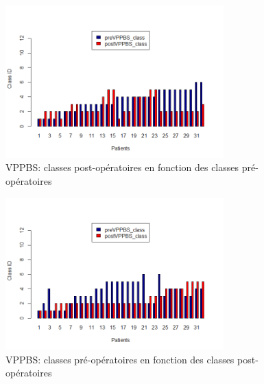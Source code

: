 \begin{figure}[H]
\centering
\includegraphics[width=0.75\textwidth]{../Fig/VPPBS/vppbs-histogram-pre-post.png}
\caption{VPPBS: classes post-opératoires en fonction des classes pré-opératoires}
\label{fig-vppbs-histogram}
\end{figure}

\begin{figure}[H]
\centering
\includegraphics[width=0.75\textwidth]{../Fig/VPPBS/vppbs-histogram-post-pre.png}
\caption{VPPBS: classes pré-opératoires en fonction des classes post-opératoires}
\label{fig-vppbs-histogram2}
\end{figure}
